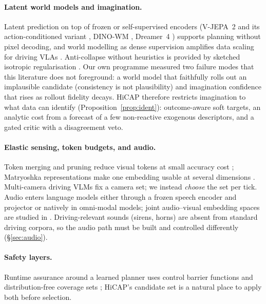 \paragraph{Latent world models and imagination.}
Latent prediction on top of frozen or self-supervised encoders (V-JEPA~2 and its action-conditioned variant
\citep{assran2025vjepa2}, DINO-WM \citep{zhou2024dinowm}, Dreamer~4 \citep{hafner2025dreamer4}) supports planning without
pixel decoding, and world modelling as dense supervision amplifies data scaling for driving VLAs \citep{li2025drivevlaw0}.
Anti-collapse without heuristics is provided by sketched isotropic regularisation \citep{balestriero2025lejepa}. Our own programme
measured two failure modes that this literature does not foreground: a world model that faithfully rolls out an implausible
candidate (consistency is not plausibility) and imagination confidence that rises as rollout fidelity decays. HiCAP therefore restricts
imagination to what data can identify (Proposition~\ref{prop:ident}): outcome-aware soft targets, an analytic cost from a forecast of a few non-reactive exogenous descriptors, and a gated critic with a disagreement veto.

\paragraph{Elastic sensing, token budgets, and audio.}
Token merging and pruning reduce visual tokens at small accuracy cost \citep{bolya2023tome,chen2024fastv}; Matryoshka
representations make one embedding usable at several dimensions \citep{kusupati2022matryoshka}.
Multi-camera driving VLMs fix a camera set; we instead \emph{choose} the set per tick. Audio enters language models either through a frozen speech encoder and projector
\citep{radford2022whisper} or natively in omni-modal models; joint audio--visual embedding spaces are studied in
\citep{girdhar2023imagebind}. Driving-relevant sounds (sirens, horns) are absent from standard driving corpora, so
the audio path must be built and controlled differently (\S\ref{sec:audio}).

\paragraph{Safety layers.}
Runtime assurance around a learned planner uses control barrier functions \citep{xiao2023barriernet} and distribution-free coverage
sets \citep{angelopoulos2021gentle}; HiCAP's candidate set is a natural place to apply both before selection.
